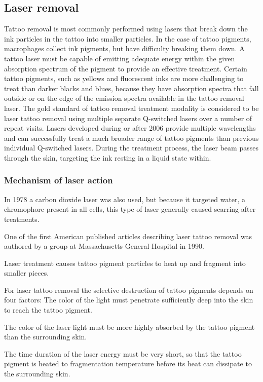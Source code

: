 \documentclass[12pt]{article}
\begin{document}
\subsection{Laser removal}
Tattoo removal is most commonly performed using lasers that break down the ink particles in the tattoo into smaller particles.
In the case of tattoo pigments, macrophages collect ink pigments, but have difficulty breaking them down.
A tattoo laser must be capable of emitting adequate energy within the given absorption spectrum of the pigment to provide an effective treatment.
Certain tattoo pigments, such as yellows and fluorescent inks are more challenging to treat than darker blacks and blues, because they have absorption spectra that fall outside or on the edge of the emission spectra available in the tattoo removal laser.
The gold standard of tattoo removal treatment modality is considered to be laser tattoo removal using multiple separate Q-switched lasers over a number of repeat visits.
Lasers developed during or after 2006 provide multiple wavelengths and can successfully treat a much broader range of tattoo pigments than previous individual Q-switched lasers.
During the treatment process, the laser beam passes through the skin, targeting the ink resting in a liquid state within.

\subsubsection{Mechanism of laser action}
In 1978 a carbon dioxide laser was also used, but because it targeted water, a chromophore present in all cells, this type of laser generally caused scarring after treatments.

One of the first American published articles describing laser tattoo removal was authored by a group at Massachusetts General Hospital in 1990.

Laser treatment causes tattoo pigment particles to heat up and fragment into smaller pieces.

For laser tattoo removal the selective destruction of tattoo pigments depends on four factors: The color of the light must penetrate sufficiently deep into the skin to reach the tattoo pigment.

The color of the laser light must be more highly absorbed by the tattoo pigment than the surrounding skin.

The time duration of the laser energy must be very short, so that the tattoo pigment is heated to fragmentation temperature before its heat can dissipate to the surrounding skin.
\end{document}
